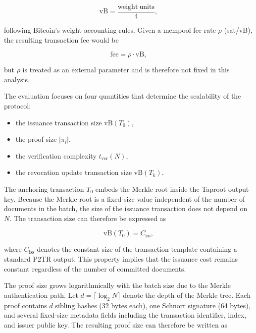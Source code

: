 \documentclass[preprint,12pt]{elsarticle}
\begin{document}
\begin{equation}
\mathrm{vB} = \frac{\mathrm{weight\ units}}{4},
\end{equation}

following Bitcoin's weight accounting rules. 
Given a mempool fee rate $\rho$ (sat/vB), the resulting transaction fee would be

\begin{equation}
\mathrm{fee} = \rho \cdot \mathrm{vB},
\end{equation}

but $\rho$ is treated as an external parameter and is therefore not fixed in this analysis.

The evaluation focuses on four quantities that determine the scalability of the protocol:

\begin{itemize}
\item the issuance transaction size $\mathrm{vB}(T_0)$,
\item the proof size $|\pi_i|$,
\item the verification complexity $t_{\mathrm{ver}}(N)$,
\item the revocation update transaction size $\mathrm{vB}(T_k)$.
\end{itemize}

The anchoring transaction $T_0$ embeds the Merkle root inside the Taproot output key. 
Because the Merkle root is a fixed-size value independent of the number of documents in the batch, the size of the issuance transaction does not depend on $N$. 
The transaction size can therefore be expressed as

\begin{equation}
\mathrm{vB}(T_0) = C_{\mathrm{iss}},
\end{equation}

where $C_{\mathrm{iss}}$ denotes the constant size of the transaction template containing a standard P2TR output. 
This property implies that the issuance cost remains constant regardless of the number of committed documents.

The proof size grows logarithmically with the batch size due to the Merkle authentication path. 
Let $d = \lceil \log_2 N \rceil$ denote the depth of the Merkle tree. 
Each proof contains $d$ sibling hashes (32 bytes each), one Schnorr signature (64 bytes), and several fixed-size metadata fields including the transaction identifier, index, and issuer public key. 
The resulting proof size can therefore be written as
\end{document}
